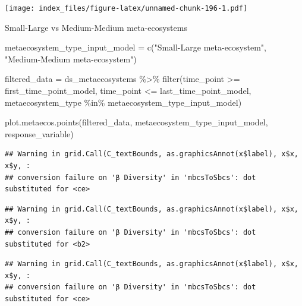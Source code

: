\documentclass[
]{article}
\newenvironment{Shaded}{\begin{snugshade}}{\end{snugshade}}
\newcommand{\FunctionTok}[1]{\textcolor[rgb]{0.00,0.00,0.00}{#1}}
\newcommand{\NormalTok}[1]{#1}
\newcommand{\OtherTok}[1]{\textcolor[rgb]{0.56,0.35,0.01}{#1}}
\newcommand{\SpecialCharTok}[1]{\textcolor[rgb]{0.00,0.00,0.00}{#1}}
\newcommand{\StringTok}[1]{\textcolor[rgb]{0.31,0.60,0.02}{#1}}
\begin{document}
\texttt{[image: index\_files/figure-latex/unnamed-chunk-196-1.pdf]}

Small-Large vs Medium-Medium meta-ecosystems

\begin{Shaded}
\begin{Highlighting}[]
\NormalTok{metaecosystem\_type\_input\_model }\OtherTok{=} \FunctionTok{c}\NormalTok{(}\StringTok{"Small{-}Large meta{-}ecosystem"}\NormalTok{,}
                                   \StringTok{"Medium{-}Medium meta{-}ecosystem"}\NormalTok{)}
\end{Highlighting}
\end{Shaded}

\begin{Shaded}
\begin{Highlighting}[]
\NormalTok{filtered\_data }\OtherTok{=}\NormalTok{ ds\_metaecosystems }\SpecialCharTok{\%\textgreater{}\%}
                         \FunctionTok{filter}\NormalTok{(time\_point }\SpecialCharTok{\textgreater{}=}\NormalTok{ first\_time\_point\_model,}
\NormalTok{                                time\_point }\SpecialCharTok{\textless{}=}\NormalTok{ last\_time\_point\_model,}
\NormalTok{                                metaecosystem\_type }\SpecialCharTok{\%in\%}\NormalTok{ metaecosystem\_type\_input\_model)}
\end{Highlighting}
\end{Shaded}

\begin{Shaded}
\begin{Highlighting}[]
\FunctionTok{plot.metaecos.points}\NormalTok{(filtered\_data,}
\NormalTok{                     metaecosystem\_type\_input\_model,}
\NormalTok{                     response\_variable)}
\end{Highlighting}
\end{Shaded}

\begin{verbatim}
## Warning in grid.Call(C_textBounds, as.graphicsAnnot(x$label), x$x, x$y, :
## conversion failure on 'β Diversity' in 'mbcsToSbcs': dot substituted for <ce>
\end{verbatim}

\begin{verbatim}
## Warning in grid.Call(C_textBounds, as.graphicsAnnot(x$label), x$x, x$y, :
## conversion failure on 'β Diversity' in 'mbcsToSbcs': dot substituted for <b2>
\end{verbatim}

\begin{verbatim}
## Warning in grid.Call(C_textBounds, as.graphicsAnnot(x$label), x$x, x$y, :
## conversion failure on 'β Diversity' in 'mbcsToSbcs': dot substituted for <ce>
\end{verbatim}
\end{document}
